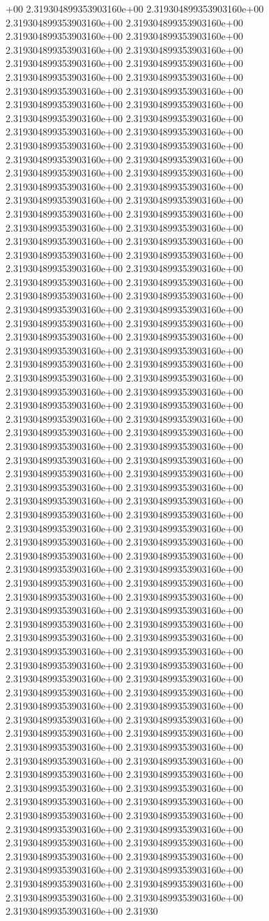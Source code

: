 +00	2.319304899353903160e+00	2.319304899353903160e+00	2.319304899353903160e+00	2.319304899353903160e+00	2.319304899353903160e+00	2.319304899353903160e+00	2.319304899353903160e+00	2.319304899353903160e+00	2.319304899353903160e+00	2.319304899353903160e+00	2.319304899353903160e+00	2.319304899353903160e+00	2.319304899353903160e+00	2.319304899353903160e+00	2.319304899353903160e+00	2.319304899353903160e+00	2.319304899353903160e+00	2.319304899353903160e+00	2.319304899353903160e+00	2.319304899353903160e+00	2.319304899353903160e+00	2.319304899353903160e+00	2.319304899353903160e+00	2.319304899353903160e+00	2.319304899353903160e+00	2.319304899353903160e+00	2.319304899353903160e+00	2.319304899353903160e+00	2.319304899353903160e+00	2.319304899353903160e+00	2.319304899353903160e+00	2.319304899353903160e+00	2.319304899353903160e+00	2.319304899353903160e+00	2.319304899353903160e+00	2.319304899353903160e+00	2.319304899353903160e+00	2.319304899353903160e+00	2.319304899353903160e+00	2.319304899353903160e+00	2.319304899353903160e+00	2.319304899353903160e+00	2.319304899353903160e+00	2.319304899353903160e+00	2.319304899353903160e+00	2.319304899353903160e+00	2.319304899353903160e+00	2.319304899353903160e+00	2.319304899353903160e+00	2.319304899353903160e+00	2.319304899353903160e+00	2.319304899353903160e+00	2.319304899353903160e+00	2.319304899353903160e+00	2.319304899353903160e+00	2.319304899353903160e+00	2.319304899353903160e+00	2.319304899353903160e+00	2.319304899353903160e+00	2.319304899353903160e+00	2.319304899353903160e+00	2.319304899353903160e+00	2.319304899353903160e+00	2.319304899353903160e+00	2.319304899353903160e+00	2.319304899353903160e+00	2.319304899353903160e+00	2.319304899353903160e+00	2.319304899353903160e+00	2.319304899353903160e+00	2.319304899353903160e+00	2.319304899353903160e+00	2.319304899353903160e+00	2.319304899353903160e+00	2.319304899353903160e+00	2.319304899353903160e+00	2.319304899353903160e+00	2.319304899353903160e+00	2.319304899353903160e+00	2.319304899353903160e+00	2.319304899353903160e+00	2.319304899353903160e+00	2.319304899353903160e+00	2.319304899353903160e+00	2.319304899353903160e+00	2.319304899353903160e+00	2.319304899353903160e+00	2.319304899353903160e+00	2.319304899353903160e+00	2.319304899353903160e+00	2.319304899353903160e+00	2.319304899353903160e+00	2.319304899353903160e+00	2.319304899353903160e+00	2.319304899353903160e+00	2.319304899353903160e+00	2.319304899353903160e+00	2.319304899353903160e+00	2.319304899353903160e+00	2.319304899353903160e+00	2.319304899353903160e+00	2.319304899353903160e+00	2.319304899353903160e+00	2.319304899353903160e+00	2.319304899353903160e+00	2.319304899353903160e+00	2.319304899353903160e+00	2.319304899353903160e+00	2.319304899353903160e+00	2.319304899353903160e+00	2.319304899353903160e+00	2.319304899353903160e+00	2.319304899353903160e+00	2.319304899353903160e+00	2.319304899353903160e+00	2.319304899353903160e+00	2.319304899353903160e+00	2.319304899353903160e+00	2.319304899353903160e+00	2.319304899353903160e+00	2.319304899353903160e+00	2.319304899353903160e+00	2.319304899353903160e+00	2.319304899353903160e+00	2.319304899353903160e+00	2.319304899353903160e+00	2.319304899353903160e+00	2.319304899353903160e+00	2.319304899353903160e+00	2.319304899353903160e+00	2.319304899353903160e+00	2.319304899353903160e+00	2.319304899353903160e+00	2.31930